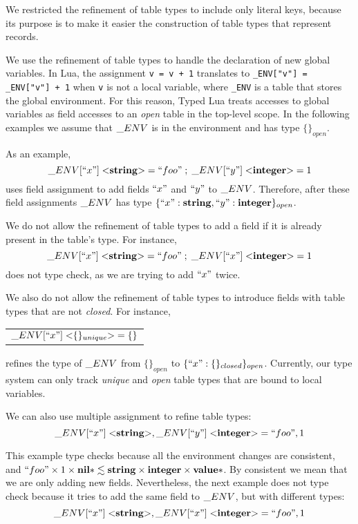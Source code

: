 We restricted the refinement of table types to include only literal
keys, because its purpose is to make it easier the construction of
table types that represent records.

We use the refinement of table types to handle the declaration of
new global variables.
In Lua, the assignment \texttt{v = v + 1} translates to
\texttt{\string_ENV["v"] = \string_ENV["v"] + 1} when \texttt{v}
is not a local variable, where \texttt{\string_ENV} is a table
that stores the global environment.
For this reason, Typed Lua treats accesses to global variables as field accesses
to an \emph{open} table in the top-level scope.
In the following examples we assume that $\string_ENV$ is in the
environment and has type $\{\}_{open}$.

As an example,
\[
\string_ENV[``x"] \; {<}\String{>} = ``foo" \;;\; \string_ENV[``y"] \; {<}\Integer{>} = 1
\]
uses field assignment to add fields $``x"$ and $``y"$ to $\string_ENV$.
Therefore, after these field assignments $\string_ENV$ has type
$\{``x":\mathbf{string}, ``y":\mathbf{integer}\}_{open}$.

We do not allow the refinement of table types to add a field if it is
already present in the table's type.
For instance,
\[
\string_ENV[``x"] \; {<}\String{>} = ``foo" \;;\; \string_ENV[``x"] \; {<}\Integer{>} = 1
\]
does not type check, as we are trying to add $``x"$ twice.

We also do not allow the refinement of table types to introduce
fields with table types that are not \emph{closed}.
For instance,
\begin{center}
\begin{tabular}{l}
$\string_ENV[``x"] \; {<}\{\}_{unique}{>} = \{\}$
\end{tabular}
\end{center}
refines the type of $\string_ENV$ from $\{\}_{open}$ to $\{``x":\{\}_{closed}\}_{open}$.
Currently, our type system can only track \emph{unique} and
\emph{open} table types that are bound to local variables.

We can also use multiple assignment to refine table types:
\[
\string_ENV[``x"] \; {<}\String{>}, \string_ENV[``y"] \; {<}\Integer{>} = ``foo", 1
\]

This example type checks because all the environment changes are consistent, and
$``foo" \times 1 \times \mathbf{nil}{*} \lesssim \mathbf{string} \times \mathbf{integer} \times \mathbf{value}{*}$.
By consistent we mean that we are only adding new fields.
Nevertheless, the next example does not type check because it tries to add
the same field to $\string_ENV$, but with different types:
\[
\string_ENV[``x"] \; {<}\String{>}, \string_ENV[``x"] \; {<}\Integer{>} = ``foo", 1
\]

